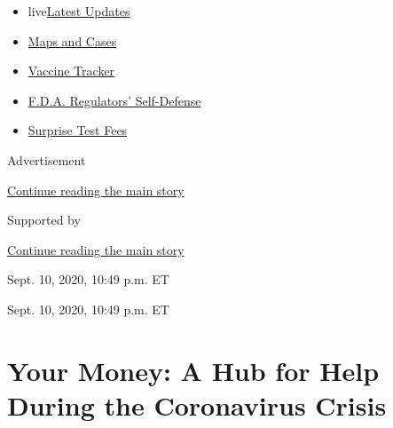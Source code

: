 \begin{itemize}
\tightlist
\item
  live\href{https://www.nytimes3xbfgragh.onion/2020/09/11/world/covid-19-coronavirus.html?name=styln-coronavirus\&region=TOP_BANNER\&block=storyline_menu_recirc\&action=click\&pgtype=Article\&impression_id=eb73acb1-f4c6-11ea-b7e2-937559d5cb01\&variant=undefined}{Latest
  Updates}
\item
  \href{https://www.nytimes3xbfgragh.onion/interactive/2020/us/coronavirus-us-cases.html?name=styln-coronavirus\&region=TOP_BANNER\&block=storyline_menu_recirc\&action=click\&pgtype=Article\&impression_id=eb73acb2-f4c6-11ea-b7e2-937559d5cb01\&variant=undefined}{Maps
  and Cases}
\item
  \href{https://www.nytimes3xbfgragh.onion/interactive/2020/science/coronavirus-vaccine-tracker.html?name=styln-coronavirus\&region=TOP_BANNER\&block=storyline_menu_recirc\&action=click\&pgtype=Article\&impression_id=eb73acb3-f4c6-11ea-b7e2-937559d5cb01\&variant=undefined}{Vaccine
  Tracker}
\item
  \href{https://www.nytimes3xbfgragh.onion/2020/09/10/us/politics/fda-coronavirus-vaccine.html?name=styln-coronavirus\&region=TOP_BANNER\&block=storyline_menu_recirc\&action=click\&pgtype=Article\&impression_id=eb73acb4-f4c6-11ea-b7e2-937559d5cb01\&variant=undefined}{F.D.A.
  Regulators' Self-Defense}
\item
  \href{https://www.nytimes3xbfgragh.onion/2020/09/09/upshot/coronavirus-surprise-test-fees.html?name=styln-coronavirus\&region=TOP_BANNER\&block=storyline_menu_recirc\&action=click\&pgtype=Article\&impression_id=eb73acb5-f4c6-11ea-b7e2-937559d5cb01\&variant=undefined}{Surprise
  Test Fees}
\end{itemize}

Advertisement

\protect\hyperlink{after-top}{Continue reading the main story}

Supported by

\protect\hyperlink{after-sponsor}{Continue reading the main story}

Sept. 10, 2020, 10:49 p.m. ET

Sept. 10, 2020, 10:49 p.m. ET

\hypertarget{your-money-a-hub-for-help-during-the-coronavirus-crisis}{%
\section{Your Money: A Hub for Help During the Coronavirus
Crisis}\label{your-money-a-hub-for-help-during-the-coronavirus-crisis}}

